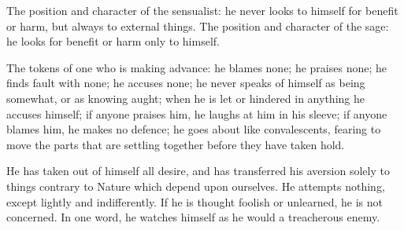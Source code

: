 The position  and character of  the sensualist: he  never looks to  himself for
benefit or harm,  but always to external things. The  position and character of
the sage: he looks for benefit or harm only to himself.

The tokens of  one who is making  advance: he blames none; he  praises none; he
finds fault  with none; he  accuses none; he never  speaks of himself  as being
somewhat,  or as  knowing aught;  when he  is let  or hindered  in anything  he
accuses himself;  if anyone  praises him, he  laughs at him  in his  sleeve; if
anyone  blames him,  he makes  no defence;  he goes  about like  convalescents,
fearing to  move the parts  that are settling  together before they  have taken
hold.

He has taken out of himself all desire, and has transferred his aversion solely
to things contrary to Nature which  depend upon ourselves. He attempts nothing,
except lightly and indifferently. If he  is thought foolish or unlearned, he is
not concerned. In one word, he watches himself as he would a treacherous enemy.
